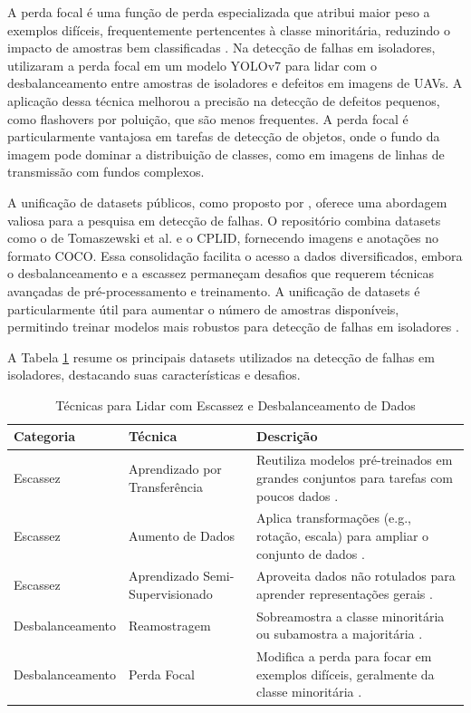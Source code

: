 A perda focal é uma função de perda especializada que atribui maior peso a exemplos difíceis, frequentemente pertencentes à classe minoritária, reduzindo o impacto de amostras bem classificadas \cite{lin2017focal}. Na detecção de falhas em isoladores,  utilizaram a perda focal em um modelo YOLOv7 para lidar com o desbalanceamento entre amostras de isoladores e defeitos em imagens de UAVs. A aplicação dessa técnica melhorou a precisão na detecção de defeitos pequenos, como flashovers por poluição, que são menos frequentes. A perda focal é particularmente vantajosa em tarefas de detecção de objetos, onde o fundo da imagem pode dominar a distribuição de classes, como em imagens de linhas de transmissão com fundos complexos.

A unificação de datasets públicos, como proposto por , oferece uma abordagem valiosa para a pesquisa em detecção de falhas. O repositório combina datasets como o de Tomaszewski et al. e o CPLID, fornecendo imagens e anotações no formato COCO. Essa consolidação facilita o acesso a dados diversificados, embora o desbalanceamento e a escassez permaneçam desafios que requerem técnicas avançadas de pré-processamento e treinamento. A unificação de datasets é particularmente útil para aumentar o número de amostras disponíveis, permitindo treinar modelos mais robustos para detecção de falhas em isoladores \cite{felix2020unifying}.

A Tabela \ref{tab:tecnicas_escassez_desbalanceamento_datasets} resume os principais datasets utilizados na detecção de falhas em isoladores, destacando suas características e desafios.

\begin{table}[H]
\centering
\caption{Técnicas para Lidar com Escassez e Desbalanceamento de Dados}
\label{tab:tecnicas_escassez_desbalanceamento_datasets}
\begin{tabular}{|p{3.5cm}|p{3.5cm}|p{7.5cm}|}
\hline
\textbf{Categoria} & \textbf{Técnica} & \textbf{Descrição} \\
\hline
Escassez & Aprendizado por Transferência & Reutiliza modelos pré-treinados em grandes conjuntos para tarefas com poucos dados \cite{pan2010survey}. \\
\hline
Escassez & Aumento de Dados & Aplica transformações (e.g., rotação, escala) para ampliar o conjunto de dados \cite{shorten2019survey}. \\
\hline
Escassez & Aprendizado Semi-Supervisionado & Aproveita dados não rotulados para aprender representações gerais \cite{van2020survey}. \\
\hline
Desbalanceamento & Reamostragem & Sobreamostra a classe minoritária ou subamostra a majoritária \cite{johnson2019survey}. \\
\hline
Desbalanceamento & Perda Focal & Modifica a perda para focar em exemplos difíceis, geralmente da classe minoritária \cite{lin2017focal}. \\
\hline
\end{tabular}
\end{table}
    

